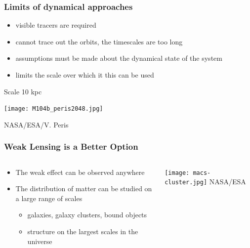 \documentclass{beamer}
\begin{document}
\frame
{
    \frametitle{Limits of dynamical approaches}

    \begin{itemize}

        \item visible tracers are required
        \item cannot trace out the orbits, the timescales are too long
        \item assumptions must be made about the dynamical state of the system
        \item limits the scale over which it this can be used

    \end{itemize}

    \centerline{Scale 10 kpc}
    \centerline{\texttt{[image: M104b\_peris2048.jpg]}}
            \hfill {\tiny NASA/ESA/V. Peris}
}


\frame
{
    \frametitle{Weak Lensing is a Better Option}

    \begin{columns}
        \begin{column}{0.5\textwidth}    
            \begin{itemize}

                \item The weak effect can be observed anywhere
                \item The distribution of matter can be studied on a large range of scales
                \begin{itemize}
                    \item galaxies, galaxy clusters, bound objects
                    \item structure on the largest scales in the universe
                \end{itemize}

            \end{itemize}
        \end{column}
        \begin{column}{0.5\textwidth}
            \begin{center}
                \texttt{[image: macs-cluster.jpg]}
                \newline
                {\tiny NASA/ESA}
            \end{center}
        \end{column}
    \end{columns}
}
\end{document}
